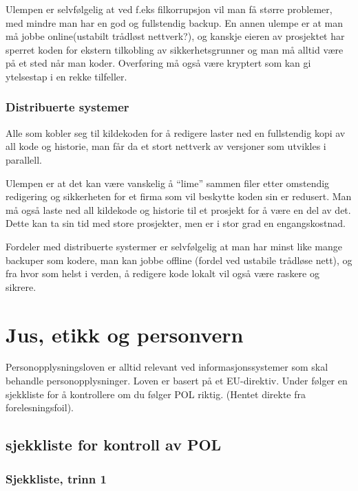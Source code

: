 \documentclass[11pt]{article}
\begin{document}
    Ulempen er selvfølgelig at ved f.eks filkorrupsjon vil man få større problemer, med mindre 
    man har en god og fullstendig backup. En annen ulempe er at man må jobbe online(ustabilt 
    trådløst nettverk?), og kanskje eieren av prosjektet har sperret koden for ekstern 
    tilkobling av sikkerhetsgrunner og man må alltid være på et sted når man koder. Overføring
    må også være kryptert som kan gi ytelsestap i en rekke tilfeller.
    
\subsubsection{Distribuerte systemer}
\label{sec-16.2.2}

    Alle som kobler seg til kildekoden for å redigere laster ned en fullstendig kopi
    av all kode og historie, man får da et stort nettverk av versjoner som utvikles i
    parallell.

    Ulempen er at det kan være vanskelig å ``lime'' sammen filer etter omstendig redigering
    og sikkerheten for et firma som vil beskytte koden sin er redusert. Man må også laste
    ned all kildekode og historie til et prosjekt for å være en del av det. Dette kan ta sin
    tid med store prosjekter, men er i stor grad en engangskostnad.

    Fordeler med distribuerte systermer er selvfølgelig at man har minst like mange backuper
    som kodere, man kan jobbe offline (fordel ved ustabile trådløse nett), og fra hvor som helst
    i verden, å redigere kode lokalt vil også være raskere og sikrere.
\section{Jus, etikk og personvern}
\label{sec-17}

  Personopplysningsloven er alltid relevant ved informasjonssystemer som skal behandle personopplysninger. Loven er basert på et EU-direktiv. Under følger en sjekkliste for å kontrollere om du følger POL riktig. (Hentet direkte fra forelesningsfoil).
\subsection{sjekkliste for kontroll av POL}
\label{sec-17.1}
\subsubsection{Sjekkliste, trinn 1}
\label{sec-17.1.1}
\end{document}
